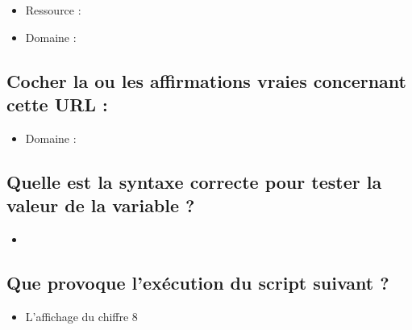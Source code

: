 \documentclass[11pt,a4paper]{article}
\begin{document}
\bigskip

\begin{itemize}
\item[\CaseCoche] Ressource :  \\
\item[\CaseCoche] Domaine :  \\
\end{itemize}


\subsection{Cocher la ou les affirmations vraies concernant cette URL :}


\bigskip

\begin{itemize}
\item[\CaseCoche] Domaine :  \\
\end{itemize}


\subsection{Quelle est la syntaxe correcte pour tester la valeur de la variable  ?}

\begin{itemize}
\item[\CaseCoche]  \\
\end{itemize}


\subsection{Que provoque l'exécution du script suivant ?}


\bigskip

\begin{itemize}
\item[\CaseCoche] L'affichage du chiffre 8 \\
\end{itemize}
\end{document}

